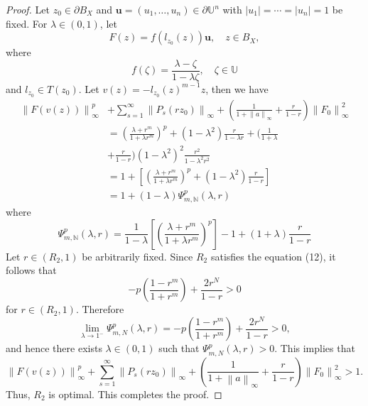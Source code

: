 \documentclass{birkjour}
\theoremstyle{plain}
\theoremstyle{definition}
\theoremstyle{definition}
\begin{document}
\begin{proof}
	Let $z_0\in \partial B_X$ and $\mathbf{u}=(u_1,\dots,u_n)\in \partial \mathbb{U}^n$ with $|u_1|=\cdots=|u_n|=1$ be fixed. For $\lambda\in(0,1)$, let
	\begin{equation*}
		F(z)=f(l_{z_0}(z))\mathbf{u},\quad z\in B_X,
	\end{equation*}
	where
	\begin{equation*}
		f(\zeta)=\frac{\lambda-\zeta}{1-\lambda\zeta},\quad \zeta\in \mathbb{U}
	\end{equation*}
	and $l_{z_0}\in T(z_0)$.
	Let $v(z)=-l_{z_0}(z)^{m-1}z$, then we have
	\begin{align*}
		\left \| F(v(z)) \right \|_{\infty}^p &+\sum_{s=1}^{\infty}\left \| P_s(rz_0) \right \|_{\infty}+(\frac{1}{1+\left \| a \right \|_{\infty}} +\frac{r}{1-r}  )\left \| F_0 \right \|^2_{\infty} \\
		&=(\frac{\lambda+r^m }{1+\lambda r^m})^p+(1-\lambda^2)\frac{r}{1-\lambda r}+(\frac{1}{1+\lambda }\\ &+\frac{r}{1-r})(1-\lambda^2)^2\frac{r^2}{1-\lambda^2r^2}\\
		&=1+[(\frac{\lambda+r^m }{1+\lambda r^m})^p+(1-\lambda^2)\frac{r}{1-r}]\\
		&=1+(1-\lambda)\Psi  _{m,\mathbb{N}}^p(\lambda,r)
	\end{align*}
	where
	\begin{equation*}
	\Psi  _{m,\mathbb{N}}^p(\lambda,r)=\frac{1}{1-\lambda}[(\frac{\lambda+r^m }{1+\lambda r^m})^p]-1+(1+\lambda)\frac{r}{1-r}
	\end{equation*}
	Let $r \in (R_2, 1)$ be arbitrarily fixed. Since $R_2$ satisfies the equation (12), it follows that
	\begin{equation*}
	-p\left(\frac{1-r^m}{1+r^m}\right) + \frac{2r^N}{1-r} > 0
	\end{equation*}
	for $r \in (R_2, 1)$. Therefore
	\begin{equation*}
	\lim_{\lambda\to 1^-} \Psi_{m,N}^p(\lambda,r)
	= -p\left(\frac{1-r^m}{1+r^m}\right) + \frac{2r^N}{1-r}
	> 0,
    \end{equation*}
	and hence there exists $\lambda \in (0,1)$ such that $\Psi_{m,N}^p(\lambda,r) > 0$. This implies that
	\begin{equation*}
	\left \| F(v(z)) \right \|_{\infty}^p+\sum_{s=1}^{\infty}\left \| P_s(rz_0) \right \|_{\infty}+(\frac{1}{1+\left \| a \right \|_{\infty}} +\frac{r}{1-r}  )\left \| F_0 \right \|^2_{\infty} > 1.
    \end{equation*}
	Thus, $R_2$ is optimal. This completes the proof.
\end{proof}
\end{document}
